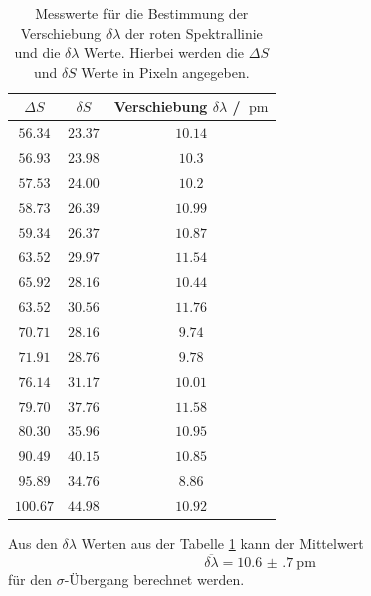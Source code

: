 \begin{table}
    \centering
    \caption{Messwerte für die Bestimmung der Verschiebung $\delta \lambda$ der roten Spektrallinie und die $\delta\lambda$ Werte. Hierbei werden die $\Delta S$ und $\delta S$ Werte in Pixeln angegeben.}
    \label{tab:rot_Verschiebung}
    \begin{tabular}{c c c}
        \toprule
        $\Delta S$&$\delta S$&Verschiebung $\delta \lambda$ / $\SI{}{\pico\meter}$\\
        \midrule 
        $\num{56.34}$&$\num{23.37}$ &$\num{10.14}$\\
        $\num{56.93}$&$\num{23.98}$ &$\num{10.3}$\\
        $\num{57.53}$&$\num{24.00}$ &$\num{10.2}$\\
        $\num{58.73}$&$\num{26.39}$ &$\num{10.99}$\\
        $\num{59.34}$&$\num{26.37}$ &$\num{10.87}$\\
        $\num{63.52}$&$\num{29.97}$ &$\num{11.54}$\\
        $\num{65.92}$&$\num{28.16}$ &$\num{10.44}$\\
        $\num{63.52}$&$\num{30.56}$ &$\num{11.76}$\\
        $\num{70.71}$&$\num{28.16}$ &$\num{9.74}$\\
        $\num{71.91}$&$\num{28.76}$ &$\num{9.78}$\\
        $\num{76.14}$&$\num{31.17}$ &$\num{10.01}$\\
        $\num{79.70}$&$\num{37.76}$ &$\num{11.58}$\\
        $\num{80.30}$&$\num{35.96}$ &$\num{10.95}$\\
        $\num{90.49}$&$\num{40.15}$ &$\num{10.85}$\\
        $\num{95.89}$&$\num{34.76}$ &$\num{8.86}$\\
        $\num{100.67}$&$\num{44.98}$&$\num{10.92}$\\
        \bottomrule
    \end{tabular}
\end{table}
\FloatBarrier
Aus den $\delta\lambda$ Werten aus der Tabelle \ref{tab:rot_Verschiebung} kann der Mittelwert
\begin{equation*}
    \overline{\delta\lambda} = \SI{10.6(7)}{\pico\meter}
\end{equation*}
für den $\sigma$-Übergang berechnet werden.
